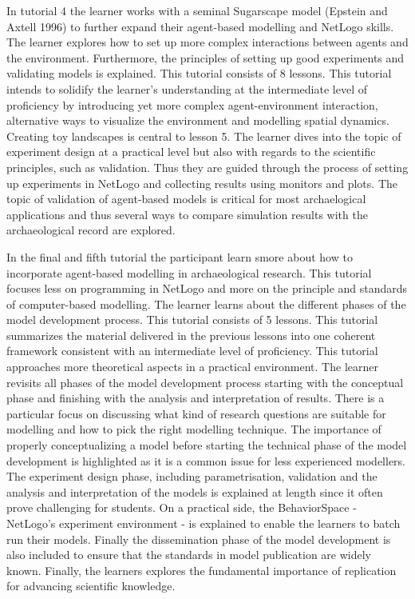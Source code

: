 \documentclass[
]{article}
\begin{document}
In tutorial 4 the learner works with a seminal Sugarscape model (Epstein and Axtell 1996) to further expand their agent-based modelling and NetLogo skills. The learner explores how to set up more complex interactions between agents and the environment. Furthermore, the principles of setting up good experiments and validating models is explained. This tutorial consists of 8 lessons. This tutorial intends to solidify the learner's understanding at the intermediate level of proficiency by introducing yet more complex agent-environment interaction, alternative ways to visualize the environment and modelling spatial dynamics. Creating toy landscapes is central to lesson 5. The learner dives into the topic of experiment design at a practical level but also with regards to the scientific principles, such as validation. Thus they are guided through the process of setting up experiments in NetLogo and collecting results using monitors and plots. The topic of validation of agent-based models is critical for most archaelogical applications and thus several ways to compare simulation results with the archaeological record are explored.

In the final and fifth tutorial the participant learn smore about how to incorporate agent-based modelling in archaeological research. This tutorial focuses less on programming in NetLogo and more on the principle and standards of computer-based modelling. The learner learns about the different phases of the model development process. This tutorial consists of 5 lessons. This tutorial summarizes the material delivered in the previous lessons into one coherent framework consistent with an intermediate level of proficiency. This tutorial approaches more theoretical aspects in a practical environment. The learner revisits all phases of the model development process starting with the conceptual phase and finishing with the analysis and interpretation of results. There is a particular focus on discussing what kind of research questions are suitable for modelling and how to pick the right modelling technique. The importance of properly conceptualizing a model before starting the technical phase of the model development is highlighted as it is a common issue for less experienced modellers. The experiment design phase, including parametrisation, validation and the analysis and interpretation of the models is explained at length since it often prove challenging for students. On a practical side, the BehaviorSpace - NetLogo's experiment environment - is explained to enable the learners to batch run their models. Finally the dissemination phase of the model development is also included to ensure that the standards in model publication are widely known. Finally, the learners explores the fundamental importance of replication for advancing scientific knowledge.
\end{document}
